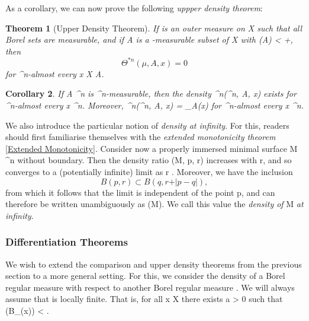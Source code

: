 \documentclass[a4paper, 11pt]{article}
\theoremstyle{plain}
\newtheorem{theorem}{Theorem}[section]
\newtheorem{corollary}[theorem]{Corollary}
\theoremstyle{definition}
\theoremstyle{remark}
\numberwithin{equation}{subsection}
\def\({}
\def\){}
\begin{document}
As a corollary, we can now prove the following \emph{uppper density theorem}:

\begin{theorem}[Upper Density Theorem]
If \(\mu\) is an outer measure on \(X\) such that all Borel sets are measurable, and if \(A\) is a \(\mu\)-measurable subset of X with \(\mu(A) < +\infty\), then
\begin{equation}
\Theta^{*n}(\mu, A, x) = 0
\end{equation}
for \(^{n}\)-almost every \(x \in X \setminus A\).
\end{theorem}

\begin{corollary}
If \(A \subset {}^{n}\) is \(^{n}\)-measurable, then the density \(\Theta^{n}(^{n}, A, x)\) exists for \(^{n}\)-almost every \(x \in {}^{n}\). Moreover, \(\Theta^{n}(^{n}, A, x) = _{A}(x)\) for \(^{n}\)-almost every \(x \in {}^{n}\).
\end{corollary}

We also introduce the particular notion of \emph{density at infinity}. For this, readers should first familiarise themselves with the \emph{extended monotonicity theorem} \ref{Extended Monotonicity}. Consider now a properly immersed minimal surface \(M \in {}^{n}\) without boundary. Then the density ratio \(\Theta(M, p, r)\) increases with \(r\), and so converges to a (potentially infinite) limit as \(r \rightarrow \infty\). Moreover, we have the inclusion
\begin{equation}
B(p,r) \subset B(q, r + \vert p-q \vert),
\end{equation}
from which it follows that the limit is independent of the point \(p\), and can therefore be written unambiguously as \(\Theta(M)\). We call this value the \emph{density of} \(M\) \emph{at infinity}.

\subsubsection{Differentiation Theorems}

We wish to extend the comparison and upper density theorems from the previous section to a more general setting. For this, we consider the density of a Borel regular measure \(\nu\) with respect to another Borel regular measure \(\mu\). We will always assume that \(\mu\) is locally finite. That is, for all \(x \in X\) there exists a \(\rho > 0\) such that \(\mu(B_{\rho}(x)) < \infty\).
\end{document}
